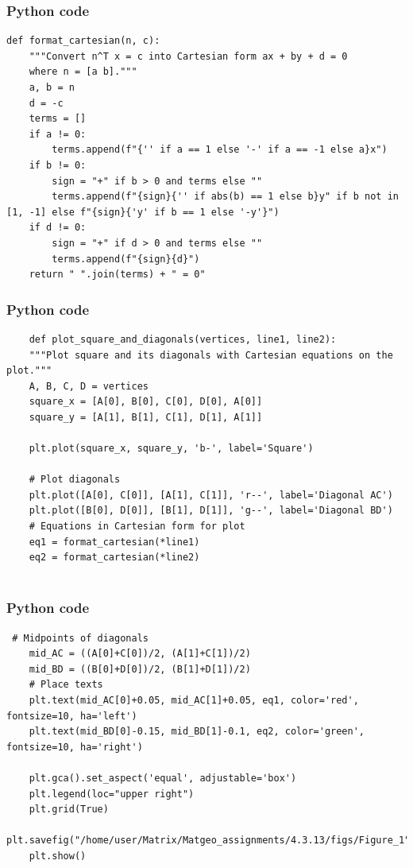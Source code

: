 \documentclass{beamer}
\begin{document}
\begin{frame}[fragile]
    \frametitle{Python code}

    \begin{lstlisting}
def format_cartesian(n, c):
    """Convert n^T x = c into Cartesian form ax + by + d = 0
    where n = [a b]."""
    a, b = n
    d = -c
    terms = []
    if a != 0:
        terms.append(f"{'' if a == 1 else '-' if a == -1 else a}x")
    if b != 0:
        sign = "+" if b > 0 and terms else ""
        terms.append(f"{sign}{'' if abs(b) == 1 else b}y" if b not in [1, -1] else f"{sign}{'y' if b == 1 else '-y'}")
    if d != 0:
        sign = "+" if d > 0 and terms else ""
        terms.append(f"{sign}{d}")
    return " ".join(terms) + " = 0"

    \end{lstlisting}
\end{frame}

\begin{frame}[fragile]
    \frametitle{Python code}

    \begin{lstlisting}
    def plot_square_and_diagonals(vertices, line1, line2):
    """Plot square and its diagonals with Cartesian equations on the plot."""
    A, B, C, D = vertices
    square_x = [A[0], B[0], C[0], D[0], A[0]]
    square_y = [A[1], B[1], C[1], D[1], A[1]]
    
    plt.plot(square_x, square_y, 'b-', label='Square')
    
    # Plot diagonals
    plt.plot([A[0], C[0]], [A[1], C[1]], 'r--', label='Diagonal AC')
    plt.plot([B[0], D[0]], [B[1], D[1]], 'g--', label='Diagonal BD')
    # Equations in Cartesian form for plot
    eq1 = format_cartesian(*line1)
    eq2 = format_cartesian(*line2)
   
    \end{lstlisting}
\end{frame}


\begin{frame}[fragile]
    \frametitle{Python code}

    \begin{lstlisting}
 # Midpoints of diagonals
    mid_AC = ((A[0]+C[0])/2, (A[1]+C[1])/2)
    mid_BD = ((B[0]+D[0])/2, (B[1]+D[1])/2)
    # Place texts
    plt.text(mid_AC[0]+0.05, mid_AC[1]+0.05, eq1, color='red', fontsize=10, ha='left')
    plt.text(mid_BD[0]-0.15, mid_BD[1]-0.1, eq2, color='green', fontsize=10, ha='right')
    
    plt.gca().set_aspect('equal', adjustable='box')
    plt.legend(loc="upper right")
    plt.grid(True)
    plt.savefig("/home/user/Matrix/Matgeo_assignments/4.3.13/figs/Figure_1")
    plt.show()
    \end{lstlisting}
\end{frame}
\end{document}
